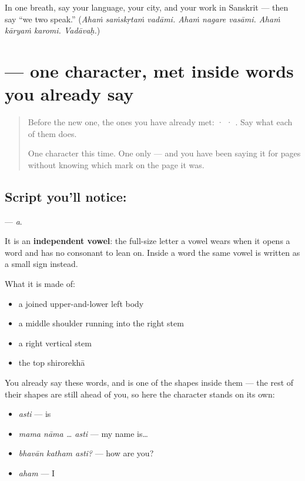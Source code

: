 \begin{tcolorbox}[breakable,colback=teal!4,colframe=teal!35!black,title={Before you move on}]
In one breath, say your language, your city, and your work in Sanskrit — then say \textquotedblleft{}we two speak.\textquotedblright{} (\emph{Ahaṁ saṁskṛtaṁ vadāmi. Ahaṁ nagare vasāmi. Ahaṁ kāryaṁ karomi. Vadāvaḥ.})
\end{tcolorbox}
\section[\texorpdfstring{\sk{अ} (a)}{अ (a)}]{ — one character, met inside words you already say}

\label{lesson:SA-S03-letter-a}



\begin{quote}
Before the new one, the ones you have already met:  ·  · . Say what each of them does.

One character this time. One only — and you have been saying it for pages without knowing which mark on the page it was.
\end{quote}

\subsection*{Script you'll notice: }
\textbf{} — \emph{a}.

It is an \textbf{independent vowel}: the full-size letter a vowel wears when it opens a word and has no consonant to lean on. Inside a word the same vowel is written as a small sign instead.

What it is made of:

\begin{itemize}
\raggedright
  \item a joined upper-and-lower left body
  \item a middle shoulder running into the right stem
  \item a right vertical stem
  \item the top shirorekhā
\end{itemize}

You already say these words, and  is one of the shapes inside them — the rest of their shapes are still ahead of you, so here the character stands on its own:

\begin{itemize}
\raggedright
  \item \emph{asti} — is
  \item \emph{mama nāma … asti} — my name is…
  \item \emph{bhavān katham asti?} — how are you?
  \item \emph{aham} — I
\end{itemize}

